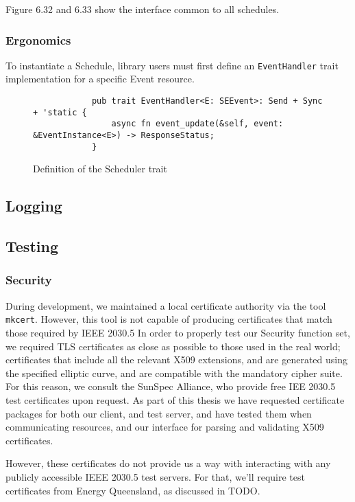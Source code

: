 Figure 6.32 and 6.33 show the interface common to all schedules.



\subsubsection{Ergonomics}
To instantiate a Schedule, library users must first define an \texttt{EventHandler} trait implementation for a specific Event resource.


\begin{figure}[h]
    \begin{center}
        \begin{lstlisting}
            pub trait EventHandler<E: SEEvent>: Send + Sync + 'static {
                async fn event_update(&self, event: &EventInstance<E>) -> ResponseStatus;
            }
        \end{lstlisting}
        \label{fig:schedulertrait}
        \vspace{-10pt}
        \caption{Definition of the Scheduler trait}
    \end{center}
\end{figure}



\subsection{Logging}

\subsection{Testing}

\subsubsection{Security}
During development, we maintained a local certificate authority via the tool \texttt{mkcert}. However, this tool is not capable of producing certificates that match those required by IEEE 2030.5
In order to properly test our Security function set, we required TLS certificates as close as possible to those used in the real world; certificates that include all the relevant X509 extensions, and are generated using the specified elliptic curve, and are compatible with the mandatory cipher suite. For this reason, we consult the SunSpec Alliance, who provide free IEE 2030.5 test certificates upon request. As part of this thesis we have requested certificate packages for both our client, and test server, and have tested them when communicating resources, and our interface for parsing and validating X509 certificates.

However, these certificates do not provide us a way with interacting with any publicly accessible IEEE 2030.5 test servers. For that, we'll require test certificates from Energy Queensland, as discussed in TODO.









